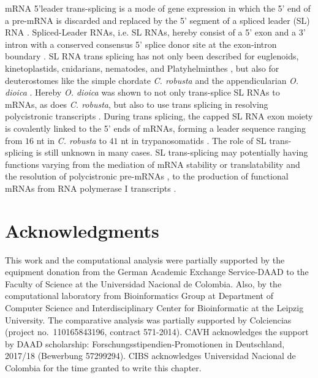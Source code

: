 \documentclass[graybox]{svmult}
\begin{document}
mRNA 5'leader trans-splicing is a mode of gene expression in which the 5' end 
of a pre-mRNA is discarded and replaced by the 5' segment of a spliced leader 
(SL) RNA \citep{Vandenberghe2001}. Spliced-Leader RNAs, i.e. SL RNAs, hereby 
consist of a 5' exon and a 3' intron with a conserved consensus 5' splice donor 
site at the exon-intron boundary \citep{Ganot2004}. SL RNA trans splicing has 
not only been described for euglenoids, kinetoplastids, cnidarians, nematodes, 
and Platyhelminthes \citep{Ganot2004}, but also for deuterostomes like the 
simple 
chordate \textit{C. robusta} \citep{Vandenberghe2001} and the 
appendicularian \textit{O. dioica} \citep{Ganot2004}. Hereby \textit{O. dioica} 
was shown to not only trans-splice SL RNAs to mRNAs, as does \textit{C. 
robusta}, but also to use trans splicing in resolving polycistronic 
transcripts \citep{Ganot2004}. During trans splicing, the capped SL RNA exon 
moiety is covalently linked to the 5' ends of mRNAs, forming a leader sequence 
ranging from $16$ nt in \textit{C. robusta} to $41$ nt in trypanosomatids 
\citep{Ganot2004}. The role of SL trans-splicing is still unknown in many cases. 
SL trans-splicing may potentially having functions varying from the mediation 
of mRNA stability or translatability \citep{Maroney1995} and the resolution 
of polycistronic pre-mRNAs \citep{Agabian1990, Blumenthal1995}, to the 
production of functional mRNAs from RNA polymerase I 
transcripts \citep{ShuLee1997}.

\section{Acknowledgments}
This work and the computational analysis were partially supported by the 
equipment donation from the German Academic Exchange Service-DAAD to the 
Faculty of Science at the Universidad Nacional de Colombia. Also, by the 
computational laboratory from Bioinformatics Group at Department of Computer 
Science and Interdisciplinary Center for Bioinformatic at the Leipzig 
University. The comparative analysis was partially supported by Colciencias 
(project no.\ 110165843196, contract 571-2014). CAVH acknowledges the support by 
DAAD scholarship: Forschungsstipendien-Promotionen in Deutschland, 2017/18 
(Bewerbung 57299294). CIBS acknowledges Universidad Nacional de Colombia for the 
time granted to write this chapter.



%
\end{document}
